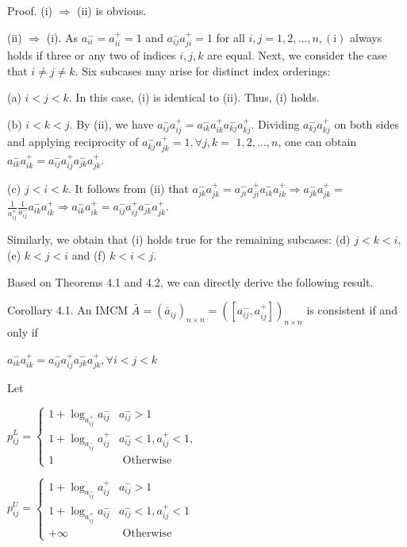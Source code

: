 \documentclass[10pt]{article}
\begin{document}
Proof. (i) $\Rightarrow$ (ii) is obvious.

(ii) $\Rightarrow$ (i). As $a_{i i}^{-}=a_{i i}^{+}=1$ and $a_{i j}^{-} a_{j i}^{+}=1$ for all $i, j=1,2, \ldots, n,(\mathrm{i})$ always holds if three or any two of indices $i, j, k$ are equal. Next, we consider the case that $i \neq j \neq k$. Six subcases may arise for distinct index orderings:

(a) $i<j<k$. In this case, (i) is identical to (ii). Thus, (i) holds.

(b) $i<k<j$. By (ii), we have $a_{i j}^{-} a_{i j}^{+}=a_{i k}^{-} a_{i k}^{+} a_{k j}^{-} a_{k j}^{+}$. Dividing $a_{k j}^{-} a_{k j}^{+}$ on both sides and applying reciprocity of $a_{k j}^{-} a_{j k}^{+}=1, \forall j, k=$ $1,2, \ldots, n$, one can obtain $a_{i k}^{-} a_{i k}^{+}=a_{i j}^{-} a_{i j}^{+} a_{j k}^{-} a_{j k}^{+}$.

(c) $j<i<k$. It follows from (ii) that $a_{j k}^{-} a_{j k}^{+}=a_{j i}^{-} a_{j i}^{+} a_{i k}^{-} a_{i k}^{+} \Rightarrow a_{j k}^{-} a_{j k}^{+}=$ $\frac{1}{a_{i j}^{+}} \frac{1}{a_{i j}^{-}} a_{i k}^{-} a_{i k}^{+} \Rightarrow a_{i k}^{-} a_{i k}^{+}=a_{i j}^{-} a_{i j}^{+} a_{j k}^{-} a_{j k}^{+}$.

Similarly, we obtain that (i) holds true for the remaining subcases: (d) $j<k<i$, (e) $k<j<i$ and (f) $k<i<j$.

Based on Theorems 4.1 and 4.2, we can directly derive the following result.

Corollary 4.1. An IMCM $\bar{A}=\left(\bar{a}_{i j}\right)_{n \times n}=\left(\left[a_{i j}^{-}, a_{i j}^{+}\right]\right)_{n \times n}$ is consistent if and only if

$a_{i k}^{-} a_{i k}^{+}=a_{i j}^{-} a_{i j}^{+} a_{j k}^{-} a_{j k}^{+}, \forall i<j<k$

Let

$p_{i j}^{L}= \begin{cases}1+\log _{a_{i j}^{+}} a_{i j}^{-} & a_{i j}^{-}>1 \\ 1+\log _{a_{i j}^{-}} a_{i j}^{+} & a_{i j}^{-}<1, a_{i j}^{+}<1, \\ 1 & \text { Otherwise }\end{cases}$

$p_{i j}^{U}= \begin{cases}1+\log _{a_{i j}^{-}} a_{i j}^{+} & a_{i j}^{-}>1 \\ 1+\log _{a_{i j}^{+}} a_{i j}^{-} & a_{i j}^{-}<1, a_{i j}^{+}<1 \\ +\infty & \text { Otherwise }\end{cases}$
\end{document}

